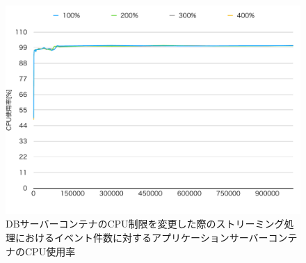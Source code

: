 \documentclass[../../../../../main]{subfiles}
\begin{document}
    \begin{figure}[H]
        \centering
        \includegraphics[width=12cm]{graph}
        \caption{DBサーバーコンテナのCPU制限を変更した際のストリーミング処理におけるイベント件数に対するアプリケーションサーバーコンテナのCPU使用率}
        \label{fig:stream-change-db-cpu-limit-app-cpu-app_4_8192-db_1024}
    \end{figure}
\end{document}
